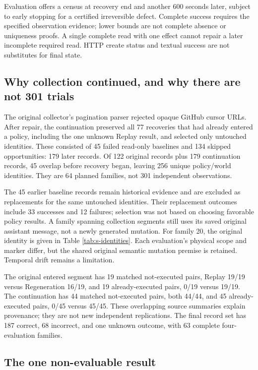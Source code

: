 \documentclass[conference]{IEEEtran}
\begin{document}
Evaluation offers a census at recovery end and another 600 seconds later, subject to early stopping for a certified irreversible defect. Complete success requires the specified observation evidence; lower bounds are not complete absence or uniqueness proofs. A single complete read with one effect cannot repair a later incomplete required read. HTTP create status and textual success are not substitutes for final state.


\subsection{Why collection continued, and why there are not 301 trials}

The original collector's pagination parser rejected opaque GitHub cursor URLs. After repair, the continuation preserved all 77 recoveries that had already entered a policy, including the one unknown Replay result, and selected only untouched identities. These consisted of 45 failed read-only baselines and 134 skipped opportunities: 179 later records. Of 122 original records plus 179 continuation records, 45 overlap before recovery began, leaving 256 unique policy/world identities. They are 64 planned families, not 301 independent observations.


The 45 earlier baseline records remain historical evidence and are excluded as replacements for the same untouched identities. Their replacement outcomes include 33 successes and 12 failures; selection was not based on choosing favorable policy results. A family spanning collection segments still uses its saved original assistant message, not a newly generated mutation. For family 20, the original identity is given in Table \ref{tab:s-identities}. Each evaluation's physical scope and marker differ, but the shared original semantic mutation premise is retained. Temporal drift remains a limitation.


The original entered segment has 19 matched not-executed pairs, Replay 19/19 versus Regeneration 16/19, and 19 already-executed pairs, 0/19 versus 19/19. The continuation has 44 matched not-executed pairs, both 44/44, and 45 already-executed pairs, 0/45 versus 45/45. These overlapping source summaries explain provenance; they are not new independent replications. The final record set has 187 correct, 68 incorrect, and one unknown outcome, with 63 complete four-evaluation families.


\subsection{The one non-evaluable result}
\end{document}
